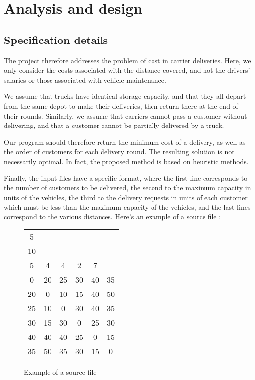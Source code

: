 \chapter{Analysis and design}

\section{Specification details}

The project therefore addresses the problem of cost in carrier deliveries. Here, we only consider the costs associated with the distance covered, and not the drivers' salaries or those associated with vehicle maintenance.

We assume that trucks have identical storage capacity, and that they all depart from the same depot to make their deliveries, then return there at the end of their rounds. Similarly, we assume that carriers cannot pass a customer without delivering, and that a customer cannot be partially delivered by a truck.

Our program should therefore return the minimum cost of a delivery, as well as the order of customers for each delivery round. The resulting solution is not necessarily optimal. In fact, the proposed method is based on heuristic methods. 

Finally, the input files have a specific format, where the first line corresponds to the number of customers to be delivered, the second to the maximum capacity in units of the vehicles, the third to the delivery requests in units of each customer which must be less than the maximum capacity of the vehicles, and the last lines correspond to the various distances. Here's an example of a source file :

\begin{figure}
\centering
\caption{Example of a source file}
\begin{tabular}{|c c c c c c|}
\hline
5	& 		 & 		& 		& 		& \\
10	& 		 & 		& 		& 		& \\
5	& 4 	 & 4 	& 2 	& 7 	& \\
0	& 20	 & 25 	& 30 	& 40 	& 35 \\
20	& 0 	 & 10 	& 15 	& 40 	& 50 \\
25	& 10	 & 0 	& 30 	& 40 	& 35 \\
30	& 15	 & 30 	& 0 	& 25 	& 30 \\
40	& 40	 & 40 	& 25 	& 0 	& 15 \\
35	& 50	 & 35	& 30 	& 15 	& 0 \\
\hline
\end{tabular}
\end{figure}

